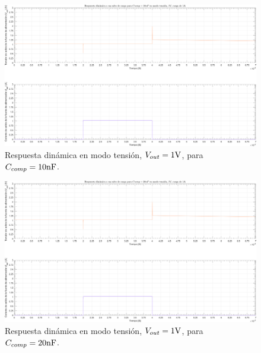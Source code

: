 \clearpage

\begin{figure}[H] %
\begin{center}
\includegraphics[width=1.1 \textwidth, angle=90]{./img/plots/dynamic/power_supply_CCOMP_10n_STEP_Modo2.png}
\caption{\label{fig:fig_power_supply_CCOMP_STEP_10n_Modo2}\footnotesize{Respuesta dinámica en modo tensión, $V_{out} = 1 \si[per-mode=symbol]{\volt}$, para $C_{comp} = 10 \si[per-mode=symbol]{\nano\farad} $.}}
\end{center}
\end{figure}

\clearpage

\begin{figure}[H] %
\begin{center}
\includegraphics[width=1.1 \textwidth, angle=90]{./img/plots/dynamic/power_supply_CCOMP_20n_STEP_Modo2.png}
\caption{\label{fig:fig_power_supply_CCOMP_STEP_20n_Modo2}\footnotesize{Respuesta dinámica en modo tensión, $V_{out} = 1 \si[per-mode=symbol]{\volt}$, para $C_{comp} = 20 \si[per-mode=symbol]{\nano\farad} $.}}
\end{center}
\end{figure}

